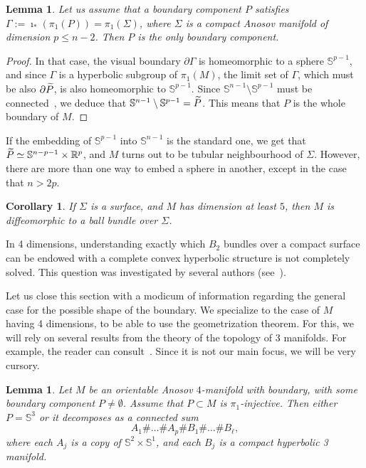 \documentclass[10pt]{amsart}
\newtheorem{lemm}[theo]{Lemma}\newtheorem{prop}[theo]{Proposition}\newtheorem{coro}[theo]{Corollary}\newtheorem{conj}[theo]{Conjecture}
\theoremstyle{definition}\newtheorem{defi}[theo]{Definition}\newtheorem{rema}[theo]{Remark}\newtheorem{exam}[theo]{Example}\newtheorem{exem}[theo]{Example}\newtheorem{nota}[theo]{Notation}
\newcommand{\R}{\mathbb{R}}
\newcommand{\Ss}{\mathbb{S}}
\theoremstyle{plain}
\let\oldtilde\tilde
\renewcommand*{\tilde}[1]{\mathchoice{\widetilde{#1}}{\widetilde{#1}}{\oldtilde{#1}}{\oldtilde{#1}}}
\begin{document}
\begin{lemm}
Let us assume that a boundary component $P$ satisfies $\Gamma:=\imath_\ast(\pi_1(P))= \pi_1(\Sigma)$, where $\Sigma$ is a compact Anosov manifold of dimension $p\leq n-2$. Then $P$ is the only boundary component.
\end{lemm}

\begin{proof}
In that case, the visual boundary $\partial \Gamma$ is homeomorphic to a sphere $\Ss^{p-1}$, and since $\Gamma$ is a hyperbolic subgroup of $\pi_1(M)$, the limit set of $\Gamma$, which must be also $\partial \tilde{P}$, is also homeomorphic to $\Ss^{p-1}$. Since $\Ss^{n-1}\setminus\Ss^{p-1}$ must be connected~\cite[Proposition~2.B.1]{Hatcher}, we deduce that $\Ss^{n-1}\setminus \Ss^{p-1} = \tilde{P}$. This means that $P$ is the whole boundary of $M$.
\end{proof}

If the embedding of $\Ss^{p-1}$ into $\Ss^{n-1}$ is the standard one, we get that $\tilde{P}\simeq \Ss^{n-p-1}\times\R^{p}$, and $M$ turns out to be tubular neighbourhood of $\Sigma$. However, there are more than one way to embed a sphere in another, except in the case that $n> 2p$.

\begin{coro}
If $\Sigma$ is a surface, and $M$ has dimension at least $5$, then $M$ is diffeomorphic to a ball bundle over $\Sigma$.
\end{coro}

In 4 dimensions, understanding exactly which $B_2$ bundles over a compact surface can be endowed with a complete convex hyperbolic structure is not completely solved. This question was investigated by several authors (see~\cite{gromov,convex-plumbing}).


Let us close this section with a modicum of information regarding the general case for the possible shape of the boundary. We specialize to the case of $M$ having 4 dimensions, to be able to use the geometrization theorem. For this, we will rely on several results from the theory of the topology of 3 manifolds. For example, the reader can consult~\cite[Section~3]{Freitas}. Since it is not our main focus, we will be very cursory.

\begin{lemm}
Let $M$ be an orientable Anosov $4$-manifold with boundary, with some boundary component $P\neq \emptyset$. Assume that $P\subset M$ is $\pi_1$-injective. Then either $P=\Ss^3$ or it decomposes as a connected sum
\[
A_1 \#\dots \# A_p \# B_1 \# \dots \# B_\ell,
\]
where each $A_j$ is a copy of $\Ss^2\times \Ss^1$, and each $B_j$ is a compact hyperbolic 3 manifold.
\end{lemm}
\end{document}

